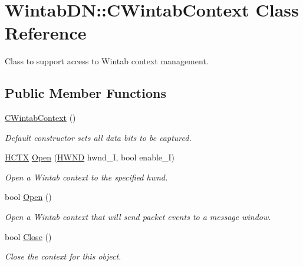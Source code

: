 \hypertarget{class_wintab_d_n_1_1_c_wintab_context}{
\section{WintabDN::CWintabContext Class Reference}
\label{class_wintab_d_n_1_1_c_wintab_context}
}


Class to support access to Wintab context management.  


\subsection*{Public Member Functions}
\begin{DoxyCompactItemize}
\item 
\hyperlink{class_wintab_d_n_1_1_c_wintab_context_a6d2c70ab796b08b33362c0baabe33124}{CWintabContext} ()
\begin{DoxyCompactList}\small\item\em Default constructor sets all data bits to be captured. \item\end{DoxyCompactList}\item 
\hyperlink{class_wintab_d_n_1_1_h_c_t_x}{HCTX} \hyperlink{class_wintab_d_n_1_1_c_wintab_context_a7d2c0ca2335288efd6a4d08d5a88ee93}{Open} (\hyperlink{struct_wintab_d_n_1_1_h_w_n_d}{HWND} hwnd\_\-I, bool enable\_\-I)
\begin{DoxyCompactList}\small\item\em Open a Wintab context to the specified hwnd. \item\end{DoxyCompactList}\item 
bool \hyperlink{class_wintab_d_n_1_1_c_wintab_context_aeacb4b849d6ae7185451d0015d740a1c}{Open} ()
\begin{DoxyCompactList}\small\item\em Open a Wintab context that will send packet events to a message window. \item\end{DoxyCompactList}\item 
bool \hyperlink{class_wintab_d_n_1_1_c_wintab_context_adb6ceb2d7f9cff8cca142b5285449b48}{Close} ()
\begin{DoxyCompactList}\small\item\em Close the context for this object. \item\end{DoxyCompactList}\item 

\end{DoxyCompactItemize}
